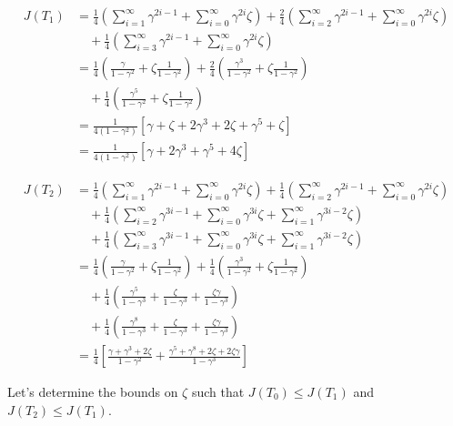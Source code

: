 \begin{align}
J(T_1) &= \frac{1}{4} \left(\sum_{i=1}^\infty \gamma^{2i-1} + \sum_{i=0}^\infty\gamma^{2i}\zeta\right) + \frac{2}{4} \left(\sum_{i=2}^\infty \gamma^{2i-1} + \sum_{i=0}^\infty\gamma^{2i}\zeta\right) \\
&\quad + \frac{1}{4} \left(\sum_{i=3}^\infty \gamma^{2i-1} + \sum_{i=0}^\infty\gamma^{2i}\zeta\right) \\
&= \frac{1}{4} \left(\frac{\gamma}{1-\gamma^2} + \zeta\frac{1}{1-\gamma^2}\right) + \frac{2}{4} \left(\frac{\gamma^3}{1-\gamma^2} + \zeta\frac{1}{1-\gamma^2}\right) \\
&\quad + \frac{1}{4} \left(\frac{\gamma^5}{1-\gamma^2} + \zeta\frac{1}{1-\gamma^2}\right) \\
&= \frac{1}{4(1-\gamma^2)} \left[\gamma + \zeta + 2\gamma^3 + 2\zeta + \gamma^5 + \zeta\right] \\
&= \frac{1}{4(1-\gamma^2)} \left[\gamma + 2\gamma^3 + \gamma^5 + 4\zeta\right]
\end{align}

\begin{align}
J(T_2) &= \frac{1}{4} \left(\sum_{i=1}^\infty \gamma^{2i-1} + \sum_{i=0}^\infty\gamma^{2i}\zeta\right) + \frac{1}{4} \left(\sum_{i=2}^\infty \gamma^{2i-1} + \sum_{i=0}^\infty\gamma^{2i}\zeta\right) \\
&\quad + \frac{1}{4} \left(\sum_{i=2}^\infty\gamma^{3i-1} + \sum_{i=0}^\infty\gamma^{3i}\zeta + \sum_{i=1}^\infty\gamma^{3i-2}\zeta\right) \\
&\quad + \frac{1}{4} \left(\sum_{i=3}^\infty\gamma^{3i-1} + \sum_{i=0}^\infty\gamma^{3i}\zeta + \sum_{i=1}^\infty\gamma^{3i-2}\zeta\right) \\
&= \frac{1}{4} \left(\frac{\gamma}{1-\gamma^2} + \zeta\frac{1}{1-\gamma^2}\right) + \frac{1}{4} \left(\frac{\gamma^3}{1-\gamma^2} + \zeta\frac{1}{1-\gamma^2}\right) \\
&\quad + \frac{1}{4} \left(\frac{\gamma^5}{1-\gamma^3} + \frac{\zeta}{1-\gamma^3} + \frac{\zeta\gamma}{1-\gamma^3}\right) \\
&\quad + \frac{1}{4} \left(\frac{\gamma^8}{1-\gamma^3} + \frac{\zeta}{1-\gamma^3} + \frac{\zeta\gamma}{1-\gamma^3}\right) \\
&= \frac{1}{4} \left[\frac{\gamma + \gamma^3 + 2\zeta}{1-\gamma^2} + \frac{\gamma^5 + \gamma^8 + 2\zeta + 2\zeta\gamma}{1-\gamma^3}\right]
\end{align}
    
Let's determine the bounds on $\zeta$ such that $J(T_0) \leq J(T_1)$ and $J(T_2) \leq J(T_1)$.


